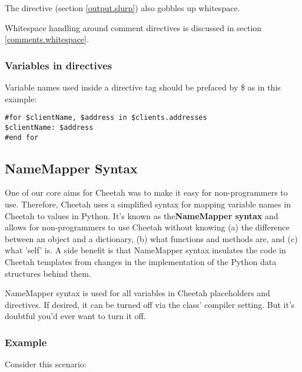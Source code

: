 The  directive (section \ref{output.slurp}) also gobbles up
whitespace.

Whitespace handling around comment directives is discussed in section
\ref{comments.whitespace}.



\subsubsection{Variables in directives}
\label{language.directives.variables}

Variable names used inside a directive tag should be prefaced by \$ as in this
example:

\begin{verbatim}
#for $clientName, $address in $clients.addresses
$clientName: $address
#end for
\end{verbatim}


\subsection{NameMapper Syntax}
\label{language.namemapper}

One of our core aims for Cheetah was to make it easy for non-programmers to
use. Therefore, Cheetah uses a simplified syntax for mapping variable
names in Cheetah to values in Python. It's known as the{\bf NameMapper syntax}
and allows for non-programmers to use Cheetah without knowing (a)
the difference between an object and a dictionary, (b) what functions
and methods are, and (c) what 'self' is. A side benefit is that NameMapper
syntax insulates the code in Cheetah templates from changes in the implementation
of the Python data structures behind them.

NameMapper syntax is used for all variables in Cheetah placeholders and
directives. If desired, it can be turned off via the  class'
 compiler setting.  But it's doubtful you'd ever want to
turn it off.

\subsubsection{Example}
\label{language.namemapper.example}

Consider this scenario:

